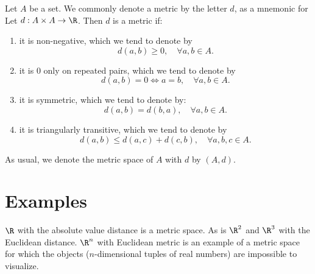 Let $A$ be a set.
We commonly denote a metric by the letter $d$, as a mnemonic for 
Let $d: A \times A \to \R $.
Then $d$ is a metric if:
  \begin{enumerate}
  \item it is non-negative, which we tend to denote by
      \[
d(a, b) \geq 0, \quad \forall a,b \in A.
      \]
  \item it is $0$ only on repeated pairs, which we tend to denote by
      \[
d(a, b) = 0 \iff a = b, \quad \forall a,b \in A.
      \]
  \item it is symmetric, which we tend to denote by:
      \[
d(a, b) = d(b, a), \quad \forall a,b \in A.
      \]
  \item it is triangularly transitive, which we tend to denote by
      \[
d(a, b) \leq d(a, c) + d(c, b), \quad \forall a,b,c \in A.
      \]
  \end{enumerate}
As usual, we denote the metric space of $A$ with $d$ by $(A, d)$.

\section*{Examples}

$\R $ with the absolute value distance is a metric space.
As is $\R ^2$ and $\R ^3$ with the Euclidean distance.
$\R ^n$ with Euclidean metric is an example of a metric space for which the objects ($n$-dimensional tuples of real numbers) are impossible to visualize.
